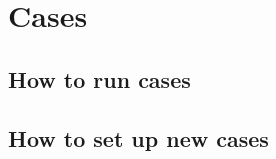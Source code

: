 \chapter{Cases}
\label{chapter: cases}
\setlength{\parskip}{12pt}

\section{How to run cases}

\section{How to set up new cases}


